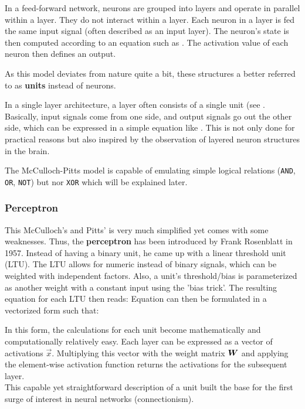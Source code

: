 In a feed-forward network, neurons are grouped into layers and operate in parallel within a layer.
They do not interact within a layer.
Each neuron in a layer is fed the same input signal (often described as an input layer).
The neuron's state is then computed according to an equation such as .
The activation value of each neuron then defines an output.

As this model deviates from nature quite a bit, these structures a better referred to as \textbf{units} instead of neurons.

In a single layer architecture, a layer often consists of a single unit (see .
Basically, input signals come from one side, and output signals go out the other side, which can be expressed in a simple equation like .
This is not only done for practical reasons but also inspired by the observation of layered neuron structures in the brain.

The McCulloch-Pitts model is capable of emulating simple logical relations (\lstinline|AND|, \lstinline|OR|, \lstinline|NOT|) but nor \lstinline|XOR| which will be explained later.

\subsubsection{Perceptron}
This McCulloch's and Pitts' is very much simplified yet comes with some weaknesses.
Thus, the \textbf{perceptron} has been introduced by Frank Rosenblatt in 1957.
Instead of having a binary unit, he came up with a linear threshold unit (LTU).
The LTU allows for numeric instead of binary signals, which can be weighted with independent factors.
Also, a unit's threshold/bias is parameterized as another weight with a constant input using the 'bias trick'.
The resulting equation for each LTU then reads:
Equation  can then be formulated in a vectorized form such that:

In this form, the calculations for each unit become mathematically and computationally relatively easy.
Each layer can be expressed as a vector of activations $\vec{x}$.
Multiplying this vector with the weight matrix $\boldsymbol{W}$ and applying the element-wise activation function returns the activations for the subsequent layer.\\
This capable yet straightforward description of a unit built the base for the first surge of interest in neural networks (connectionism).

